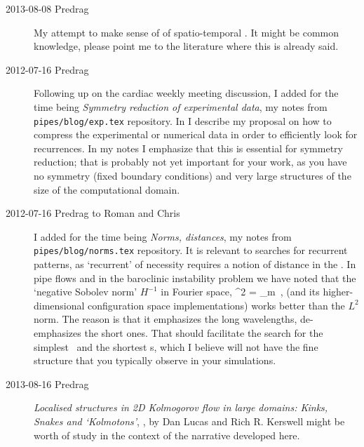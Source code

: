 \begin{description}

\item[2013-08-08 Predrag]
My attempt to make sense of of spatio-temporal \turbulence. It might be
common knowledge, please point me to the literature where this is already
said.


\item[2012-07-16  Predrag]
Following up on the cardiac weekly meeting discussion, I added for the
time being  {\em Symmetry reduction of experimental data},
my notes from \texttt{pipes/blog/exp.tex} repository. In
 I describe my proposal on how to compress the
experimental or numerical data in order to efficiently look for
recurrences. In my notes I emphasize that this is essential for symmetry
reduction; that is probably not yet important for your work, as you have
no symmetry (fixed boundary conditions) and very large structures of the
size of the computational domain.

\item[2012-07-16  Predrag to Roman and Chris]
I added for the time being  {\em Norms, distances}, my
notes from \texttt{pipes/blog/norms.tex} repository. It is relevant to searches
for recurrent patterns, as `recurrent' of necessity requires a notion of distance
in the \statesp. In pipe flows and in the baroclinic instability problem we have
noted that the `negative Sobolev norm' $H^{-1}$ in Fourier space,
\beq
\Norm{\ssp}^2
   =
   \sum_{m } 
\,,
(and its higher-dimensional configuration space implementations) works
better than the $L^2$ norm. The reason is that it emphasizes the long
wavelengths, de-emphasizes the short ones. That should facilitate the
search for the simplest \eqva\ and the shortest \po s, which I believe
will not have the fine structure that you typically observe in your
simulations.

\item[2013-08-16 Predrag]
{\em Localised structures in 2D Kolmogorov flow in large domains:
Kinks, Snakes and `Kolmotons'}, , by
Dan Lucas and Rich R. Kerswell might be worth of study
in the context of the narrative developed here.


\end{description}
